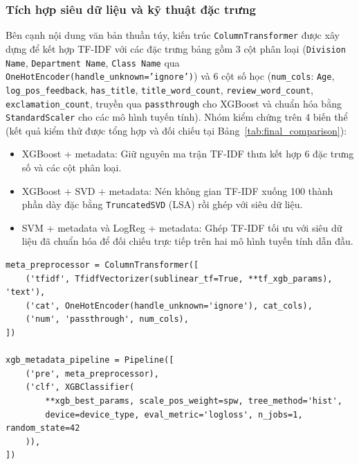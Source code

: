 \subsubsection{Tích hợp siêu dữ liệu và kỹ thuật đặc trưng}
Bên cạnh nội dung văn bản thuần túy, kiến trúc \texttt{ColumnTransformer} được xây dựng để kết hợp TF-IDF với các đặc trưng bảng gồm 3 cột phân loại (\texttt{Division Name}, \texttt{Department Name}, \texttt{Class Name} qua \texttt{OneHotEncoder(\allowbreak handle\_unknown=\allowbreak'ignore')}) và 6 cột số học (\texttt{num\_cols}: \texttt{Age}, \texttt{log\_pos\_feedback}, \texttt{has\_title}, \texttt{title\_word\_count}, \texttt{review\_word\_count}, \texttt{exclamation\_\allowbreak count}, truyền qua \texttt{passthrough} cho XGBoost và chuẩn hóa bằng \texttt{StandardScaler} cho các mô hình tuyến tính). Nhóm kiểm chứng trên 4 biến thể (kết quả kiểm thử được tổng hợp và đối chiếu tại Bảng~\ref{tab:final_comparison}):
\begin{itemize}
    \item XGBoost + metadata: Giữ nguyên ma trận TF-IDF thưa kết hợp 6 đặc trưng số và các cột phân loại.
    \item XGBoost + SVD + metadata: Nén không gian TF-IDF xuống 100 thành phần dày đặc bằng \texttt{TruncatedSVD} (LSA) rồi ghép với siêu dữ liệu.
    \item SVM + metadata và LogReg + metadata: Ghép TF-IDF tối ưu với siêu dữ liệu đã chuẩn hóa để đối chiếu trực tiếp trên hai mô hình tuyến tính dẫn đầu.
\end{itemize}

\begin{lstlisting}[caption={Kiến trúc ColumnTransformer kết hợp văn bản TF-IDF và siêu dữ liệu cho XGBoost}, label={lst:xgb_meta}]
meta_preprocessor = ColumnTransformer([
    ('tfidf', TfidfVectorizer(sublinear_tf=True, **tf_xgb_params), 'text'),
    ('cat', OneHotEncoder(handle_unknown='ignore'), cat_cols),
    ('num', 'passthrough', num_cols),
])

xgb_metadata_pipeline = Pipeline([
    ('pre', meta_preprocessor),
    ('clf', XGBClassifier(
        **xgb_best_params, scale_pos_weight=spw, tree_method='hist',
        device=device_type, eval_metric='logloss', n_jobs=1, random_state=42
    )),
])
\end{lstlisting}

